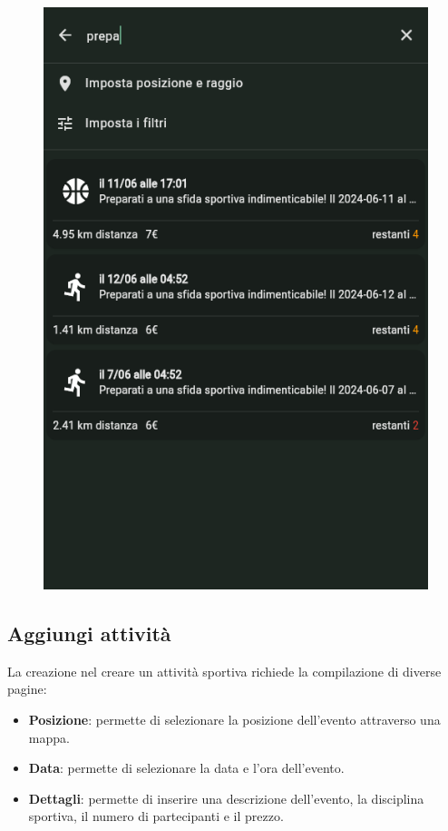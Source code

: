 \documentclass[a4paper,12pt]{article}
\begin{document}
\begin{figure}[h]
\begin{minipage}{0.32\textwidth}
        \includegraphics[width=1\linewidth]{img/search_activity.png}
    \end{minipage}
\end{figure}

\subsection{Aggiungi attività}

La creazione nel creare un attività sportiva richiede la compilazione di diverse pagine:
\begin{itemize}
    \item \textbf{Posizione}: permette di selezionare la posizione dell'evento attraverso una mappa.
    \item \textbf{Data}: permette di selezionare la data e l'ora dell'evento.
    \item \textbf{Dettagli}: permette di inserire una descrizione dell'evento, la disciplina sportiva, il numero di partecipanti e il prezzo.
\end{itemize}
\end{document}
